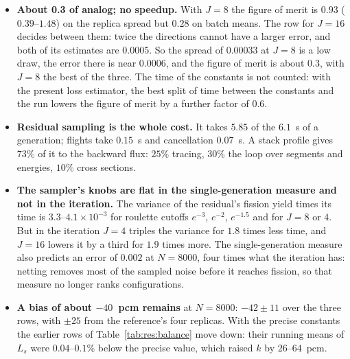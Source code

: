\begin{itemize}
\item \textbf{About 0.3 of analog; no speedup.} With $J=8$ the figure of merit is $0.93$
  ($0.39$--$1.48$) on the replica spread but $0.28$ on batch means. The row for $J=16$ decides
  between them: twice the directions cannot have a larger error, and both of its estimates are
  $0.0005$. So the spread of $0.00033$ at $J=8$ is a low draw, the error there is near $0.0006$, and
  the figure of merit is about $0.3$, with $J=8$ the best of the three. The time of the constants
  is not counted: with the present loss estimator, the best split of time between the constants and
  the run lowers the figure of merit by a further factor of $0.6$.
\item \textbf{Residual sampling is the whole cost.} It takes $5.85$ of the $6.1$~s of a generation;
  flights take $0.15$~s and cancellation $0.07$~s. A stack profile gives $73\%$ of it to the
  backward flux: $25\%$ tracing, $30\%$ the loop over segments and energies, $10\%$ cross sections.
\item \textbf{The sampler's knobs are flat in the single-generation measure and not in the
  iteration.} The variance of the residual's fission yield times its time is $3.3$--$4.1\times10^{-3}$ for
  roulette cutoffs $e^{-3}$, $e^{-2}$, $e^{-1.5}$ and for $J=8$ or $4$. But in the iteration
  $J=4$ triples the variance for $1.8$ times less time, and $J=16$ lowers it by a third for $1.9$ times more. The single-generation measure also predicts
  an error of $0.002$ at $N=8000$, four times what the iteration has: netting removes most of the
  sampled noise before it reaches fission, so that measure no longer ranks configurations.
\item \textbf{A bias of about $-40$~pcm remains} at $N=8000$: $-42\pm11$ over the three rows, with
  $\pm25$ from the reference's four replicas. With the precise constants the earlier rows of
  Table~\ref{tab:res:balance} move down: their running means of $L_s$ were $0.04$--$0.1\%$ below
  the precise value, which raised $k$ by $26$--$64$~pcm.
\end{itemize}

